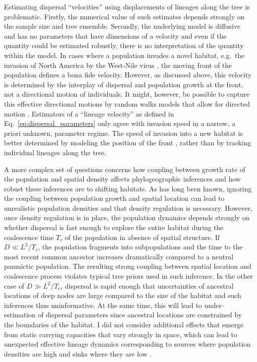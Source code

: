 \documentclass[aps,rmp, twocolumn]{revtex4}
\begin{document}
Estimating dispersal ``velocities'' using displacements of lineages along the tree is problematic.
Firstly, the numerical value of such estimates depends strongly on the sample size and tree ensemble.
Secondly, the underlying model is diffusive and has no parameters that have dimensions of a velocity and even if the quantity could be estimated robustly, there is no interpretation of the quantity within the model.
In cases where a population invades a novel habitat, e.g.~the invasion of North America by the West-Nile virus \citep{pybus_unifying_2012}, the moving front of the population defines a bona fide velocity.
However, as discussed above, this velocity is determined by the interplay of dispersal and population growth at the front, not a directional motion of individuals.
It might, however, be possible to capture this effective directional motions by random walks models that allow for directed motion \citep{gill_relaxed_2017}.
Estimators of a ``lineage velocity'' as defined in Eq.~\ref{eq:dispersal_parameters} only agree with invasion speed in a narrow, a priori unknown, parameter regime.
The speed of invasion into a new habitat is better determined by modeling the position of the front \citep{pybus_unifying_2012}, rather than by tracking individual lineages along the tree.


A more complex set of questions concerns how coupling between growth rate of the population and spatial density affects phylogeographic inferences and how robust these inferences are to shifting habitats.
As has long been known, ignoring the coupling between population growth and spatial location can lead to unrealistic population densities \citep{felsenstein_pain_1975} and that density regulation is necessary.
However, once density regulation is in place, the population dynamics depends strongly on whether dispersal is fast enough to explore the entire habitat during the coalescence time $T_c$ of the population in absence of spatial structure.
If $D\ll L^2/T_c$, the population fragments into subpopulations and the time to the most recent common ancestor increases dramatically compared to a neutral panmictic population.
The resulting strong coupling between spatial location and coalescence process violates typical tree priors used in such inference.
In the other case of $D\gg L^2/T_c$, dispersal is rapid enough that uncertainties of ancestral locations of deep nodes are large compared to the size of the habitat and such inferences thus uninformative.
At the same time, this will lead to under-estimation of dispersal parameters since ancestral locations are constrained by the boundaries of the habitat.
I did not consider additional effects that emerge from static carrying capacities that vary strongly in space, which can lead to unexpected effective lineage dynamics corresponding to sources where population densities are high and sinks where they are low \citep{wilkins_coalescent_2002, hallatschek_gene_2008}.
\end{document}
